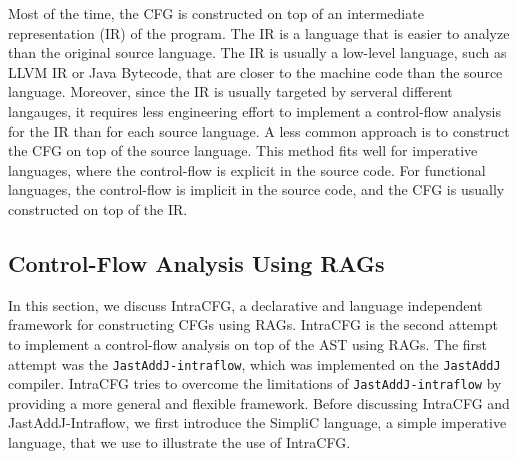 Most of the time, the CFG is constructed on top of an intermediate representation
(IR) of the program. The IR is a language that is easier to analyze than the original
source language. The IR is usually a low-level language, such as LLVM IR or Java Bytecode, that are
closer to the machine code than the source language. 
Moreover, since the IR is usually targeted by serveral different langauges, 
it requires less engineering effort to implement a control-flow analysis for the IR than for each
source language.
A less common approach is to construct the CFG on top of the source language.
This method fits well for imperative languages, where the control-flow is 
explicit in the source code. For functional languages, the
control-flow is implicit in the source code, and the CFG is usually constructed
on top of the IR.




\subsection{Control-Flow Analysis Using RAGs}
\label{sec:cfarag}
In this section, we discuss IntraCFG, a declarative and language independent framework for 
constructing CFGs using RAGs. IntraCFG is the second attempt to implement a control-flow analysis
on top of the AST using RAGs. The first attempt was the \texttt{JastAddJ-intraflow}, which was
implemented on the \texttt{JastAddJ} compiler. IntraCFG tries to overcome the limitations of
\texttt{JastAddJ-intraflow} by providing a more general and flexible framework.
Before discussing IntraCFG and JastAddJ-Intraflow, we first introduce the 
SimpliC language, a simple imperative language, that we use to illustrate the use of IntraCFG.

